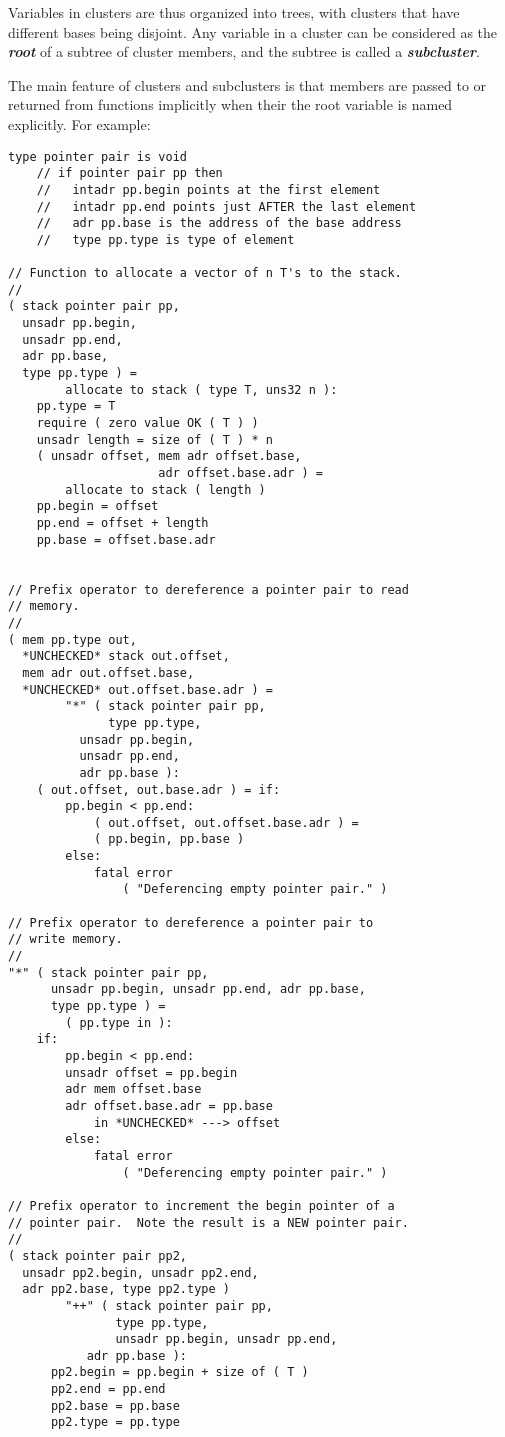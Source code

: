\documentclass[12pt]{article}
\newcommand{\key}[1]{{\bf \em #1}\index{#1}}
\newcommand{\mkey}[2]{{\bf \em #1}\index{#1!#2}}
\newenvironment{indpar}[1][0.3in]%
	{\begin{list}{}%
		     {\setlength{\itemsep}{0in}%
		      \setlength{\topsep}{0in}%
		      \setlength{\parsep}{1ex}%
		      \setlength{\labelwidth}{#1}%
		      \setlength{\leftmargin}{#1}%
		      \addtolength{\leftmargin}{\labelsep}}%
	 \item}%
	{\end{list}}
\begin{document}
Variables in clusters are thus organized into trees, with clusters
that have different bases being disjoint.  Any variable in a cluster
can be considered
as the \mkey{root}{of subcluster} of a subtree of cluster members, and
the subtree is called a \key{subcluster}.

The main feature of clusters and subclusters
is that members are passed to or returned
from functions implicitly when their the root variable is named
explicitly.  For example:
\begin{indpar}\begin{verbatim}
type pointer pair is void
    // if pointer pair pp then
    //   intadr pp.begin points at the first element
    //   intadr pp.end points just AFTER the last element
    //   adr pp.base is the address of the base address
    //   type pp.type is type of element

// Function to allocate a vector of n T's to the stack.
//
( stack pointer pair pp,
  unsadr pp.begin,
  unsadr pp.end,
  adr pp.base,
  type pp.type ) =
        allocate to stack ( type T, uns32 n ):
    pp.type = T
    require ( zero value OK ( T ) )
    unsadr length = size of ( T ) * n
    ( unsadr offset, mem adr offset.base,
                     adr offset.base.adr ) =
        allocate to stack ( length )
    pp.begin = offset
    pp.end = offset + length
    pp.base = offset.base.adr


// Prefix operator to dereference a pointer pair to read
// memory.
//
( mem pp.type out,
  *UNCHECKED* stack out.offset,
  mem adr out.offset.base,
  *UNCHECKED* out.offset.base.adr ) =
        "*" ( stack pointer pair pp,
              type pp.type,
	      unsadr pp.begin,
	      unsadr pp.end,
	      adr pp.base ):
    ( out.offset, out.base.adr ) = if:
        pp.begin < pp.end:
            ( out.offset, out.offset.base.adr ) =
	        ( pp.begin, pp.base )
        else:
            fatal error
                ( "Deferencing empty pointer pair." )

// Prefix operator to dereference a pointer pair to
// write memory.
//
"*" ( stack pointer pair pp,
      unsadr pp.begin, unsadr pp.end, adr pp.base,
      type pp.type ) =
        ( pp.type in ):
    if:
        pp.begin < pp.end:
	    unsadr offset = pp.begin
	    adr mem offset.base
	    adr offset.base.adr = pp.base
            in *UNCHECKED* ---> offset
        else:
            fatal error
                ( "Deferencing empty pointer pair." )

// Prefix operator to increment the begin pointer of a
// pointer pair.  Note the result is a NEW pointer pair.
//
( stack pointer pair pp2,
  unsadr pp2.begin, unsadr pp2.end,
  adr pp2.base, type pp2.type )
        "++" ( stack pointer pair pp,
               type pp.type,
               unsadr pp.begin, unsadr pp.end,
	       adr pp.base ):
      pp2.begin = pp.begin + size of ( T )
      pp2.end = pp.end
      pp2.base = pp.base
      pp2.type = pp.type


\end{verbatim}
\end{indpar}
\end{document}
